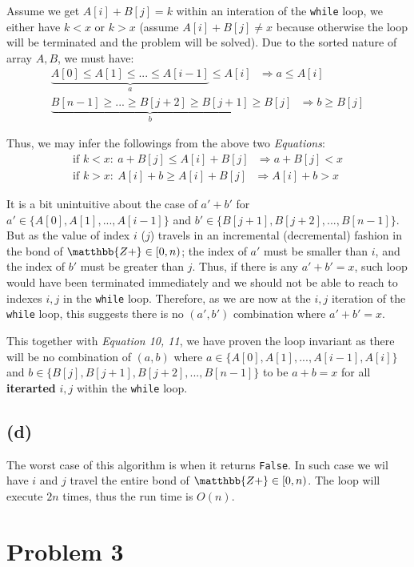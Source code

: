 \documentclass[12pt]{article}
\newcommand{\inlinecode}{\texttt}
\begin{document}
Assume we get $A[i] + B[j] = k$ within an interation of the \inlinecode{while} loop, we either have $k < x$ or $k > x$ (assume $A[i] + B[j] \neq x$ because otherwise the loop will be terminated and the problem will be solved). Due to the sorted nature of array $A, B$, we must have:
\begin{gather}
    \underbrace{A[0] \leq A[1] \leq ... \leq A[i-1]}_{a} \leq A[i]  \ \ \ \Rightarrow a \leq A[i]\\
    \underbrace{B[n-1] \geq ... \geq B[j+2] \geq B[j+1]}_{b} \geq B[j] \ \ \ \Rightarrow b \geq B[j]
\end{gather}

Thus, we may infer the followings from the above two \textit{Equations}:
\begin{gather}
    \text{if } k < x: \ a + B[j] \leq A[i] + B[j]  \ \ \ \Rightarrow a + B[j] < x\\
    \text{if } k > x: \ A[i] + b \geq A[i] + B[j]  \ \ \ \Rightarrow A[i] + b > x
\end{gather}

It is a bit unintuitive about the case of $a' + b'$ for $a' \in \{A[0], A[1], ..., A[i-1]\}$ and $b' \in \{B[j+1], B[j+2], ..., B[n-1]\}$. But as the value of index $i$ ($j$) travels in an incremental (decremental) fashion in the bond of $\matthbb{Z+} \in [0, n)$; the index of $a'$ must be smaller than $i$, and the index of $b'$ must be greater than $j$. Thus, if there is any $a' + b' = x$, such loop would have been terminated immediately and we should not be able to reach to indexes $i, j$ in the \inlinecode{while} loop. Therefore, as we are now at the $i, j$ iteration of the \inlinecode{while} loop, this suggests there is no $(a', b')$ combination where $a' + b' = x$.

This together with \textit{Equation 10, 11}, we have proven the loop invariant as there will be no combination of $(a, b)$ where $a \in \{A[0], A[1], ..., A[i-1], A[i]\}$ and $b \in \{B[j], B[j+1], B[j+2], ..., B[n-1]\}$ to be $a + b = x$ for all \textbf{iterarted} $i, j$ within the \inlinecode{while} loop.

\subsection{(d)}
The worst case of this algorithm is when it returns \inlinecode{False}. In such case we wil have $i$ and $j$ travel the entire bond of $\matthbb{Z+} \in [0, n)$. The loop will execute $2n$ times, thus the run time is $O(n)$.

\section{Problem 3}


%
% 
% 
\end{document}
